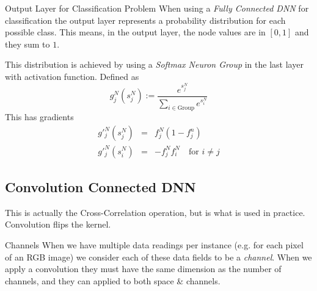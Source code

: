 \documentclass[11pt,a4paper]{article}
\begin{document}
  \begin{proposition}{Output Layer for Classification Problem}
    When using a \textit{Fully Connected DNN} for classification the output layer represents a probability distribution for each possible class. This means, in the output layer, the node values are in $[0,1]$ and they sum to $1$.
    \par This distribution is achieved by using a \textit{Softmax Neuron Group} in the last layer with activation function. Defined as
    \[  g_j^N(s_j^N):=\frac{e^{s_j^N}}{\displaystyle\sum_{i\in\text{Group}}e^{s_i^N}} \]
    This has gradients
    \[\begin{array}{rcl}
      g'_j^N(s_j^N)&=&f_j^N(1-f_j^n)\\
      g'_j^N(s_{i}^N)&=&-f_j^Nf_i^N\quad\text{for }i\neq j
    \end{array}\]
  \end{proposition}

\subsection{Convolution Connected DNN}

  \begin{remark}{This is actually the Cross-Correlation operation, but is what is used in practice.}
    Convolution flips the kernel.
  \end{remark}

  \begin{definition}{Channels}
    When we have multiple data readings per instance (e.g. for each pixel of an RGB image) we consider each of these data fields to be a \textit{channel}. When we apply a convolution they must have the same dimension as the number of channels, and they can applied to both space \& channels.
  \end{definition}
\end{document}
